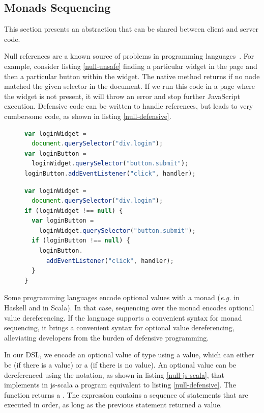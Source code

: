 \documentclass[preprint]{sigplanconf}
\newcommand{\eg}{\emph{e.g.}}
\begin{document}
\subsection{Monads Sequencing}

This section presents an abstraction that can be shared between client and server code.

Null references are a known source of problems in programming
languages~\cite{Hoare09_Null,Nanda09_Null}. For example, consider listing \ref{null-unsafe} finding
a particular widget in the page and then a particular button within the widget. The native
 method returns  if no node matched the given selector in the
document. If we run this code in a page where the widget is not present, it will throw an error
and stop further JavaScript execution. Defensive code can be written to handle 
references, but leads to very cumbersome code, as shown in listing \ref{null-defensive}.

\begin{figure}
\begin{lstlisting}[language=JavaScript,label=null-unsafe,caption=Unsafe code]
var loginWidget =
  document.querySelector("div.login");
var loginButton =
  loginWidget.querySelector("button.submit");
loginButton.addEventListener("click", handler);
\end{lstlisting}
\end{figure}


\begin{figure}
\begin{lstlisting}[language=JavaScript,label=null-defensive,caption=Defensive programming to handle
null references]
var loginWidget =
  document.querySelector("div.login");
if (loginWidget !== null) {
  var loginButton =
    loginWidget.querySelector("button.submit");
  if (loginButton !== null) {
    loginButton.
      addEventListener("click", handler);
  }
}
\end{lstlisting}
\end{figure}

Some programming languages encode optional values with a monad (\eg{}  in Haskell and
 in Scala). In that case, sequencing over the monad encodes optional value
dereferencing. If the language supports a convenient syntax for monad sequencing, it brings a
convenient syntax for optional value dereferencing, alleviating developers from the burden of
defensive programming.

In our DSL, we encode an optional value of type  using a  value,
which can either be  (if there is a value) or a  (if
there is no value). An optional value can be dereferenced using the  notation, as shown
in listing \ref{null-js-scala}, that implements in js-scala a program equivalent to listing
\ref{null-defensive}. The  function returns a . The 
expression contains a sequence of statements that are executed in order, as long as the previous
statement returned a  value.
\end{document}
